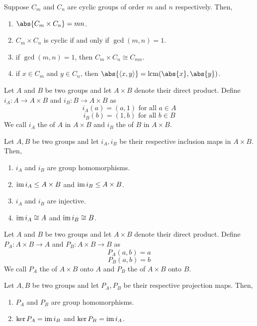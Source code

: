 \begin{prop} \label{prop:product-of-cyclic}
    Suppose $C_m$ and $C_n$ are cyclic groups of order $m$ and $n$ respectively. Then,
    \begin{enumerate}
        \item $\abs{C_m \times C_n} = mn$.
        \item $C_m \times C_n$ is cyclic if and only if $\gcd(m,n) = 1$.
        \item if $\gcd(m,n) = 1$, then $C_m \times C_n \cong C_{mn}$.
        \item if $x \in C_m$ and $y \in C_n$, then $\abs{\langle x,y \rangle} = \lcm(\abs{x}, \abs{y})$.
    \end{enumerate}
\end{prop}
\begin{defn}
    Let $A$ and $B$ be two groups and let $A \times B$ denote their direct product. Define $i_A \colon A \to A \times B$ and $i_B \colon B \to A \times B$ as
    \[
        i_A(a) = (a,1) \text{ for all } a \in A
    \]
    \[
        i_B(b) = (1,b) \text{ for all } b \in B
    \]
    We call $i_A$ the  of $A$ in $A \times B$ and $i_B$ the  of $B$ in $A \times B$.
\end{defn}
\begin{prop} \label{prop:inclusion-map-basics}
    Let $A,B$ be two groups and let $i_A, i_B$ be their respective inclusion maps in $A \times B$. Then,
    \begin{enumerate}
        \item $i_A$ and $i_B$ are group homomorphisms.
        \item $\operatorname{im} i_A \leq A \times B$ and $\operatorname{im} i_B \leq A \times B$.
        \item $i_A$ and $i_B$ are injective.
        \item $\operatorname{im} i_A \cong A$ and $\operatorname{im} i_B \cong B$.
    \end{enumerate}
\end{prop}
\begin{defn}
    Let $A$ and $B$ be two groups and let $A \times B$ denote their direct product. Define $P_A \colon A \times B \to A$ and $P_B \colon A \times B \to B$ as
    \[
        P_A(a,b) = a
    \]
    \[
        P_B(a,b) = b
    \]
    We call $P_A$ the  of $A \times B$ onto $A$ and $P_B$ the  of $A \times B$ onto $B$.
\end{defn}
\begin{prop} \label{prop:projection-map-basics}
    Let $A,B$ be two groups and let $P_A, P_B$ be their respective projection maps. Then,
    \begin{enumerate}
        \item $P_A$ and $P_B$ are group homomorphisms.
        \item $\ker P_A = \operatorname{im} i_B$ and $\ker P_B = \operatorname{im} i_A$.
    \end{enumerate}
\end{prop}
